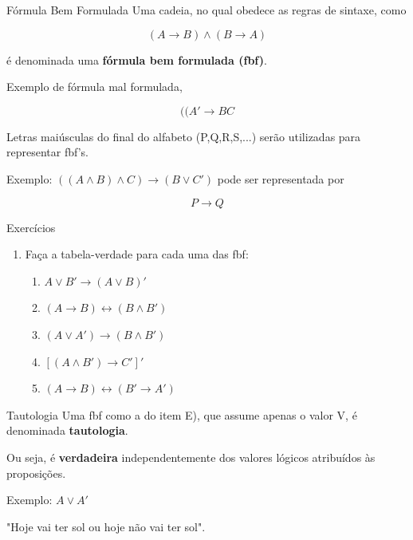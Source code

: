\documentclass[aspectratio=169]{beamer}
\begin{document}
\begin{frame}{Fórmula Bem Formulada}
    Uma cadeia, no qual obedece as regras de sintaxe, como

    \[(A \rightarrow B) \wedge (B \rightarrow A)\]


    é denominada uma \textbf{fórmula bem formulada (fbf)}.

    \vspace{5mm}

    Exemplo de fórmula mal formulada,

    \[((A' \rightarrow BC \]

    Letras maiúsculas do final do alfabeto (P,Q,R,S,...) serão utilizadas para representar fbf's.

    Exemplo: $ ((A \wedge B)\wedge C) \rightarrow (B \vee C')$ pode ser representada por

    \[ P \rightarrow Q \]

\end{frame}

\begin{frame}{Exercícios}
    \begin{enumerate}
        \item Faça a tabela-verdade para cada uma das fbf:
              \begin{enumerate}[a]
                  \item $ A \vee B' \rightarrow (A \vee B)' $
                  \item $ (A \rightarrow B) \leftrightarrow (B \wedge B') $
                  \item $ (A \vee A') \rightarrow (B \wedge B')$
                  \item $ [(A \wedge B') \rightarrow C']'$
                  \item $ (A \rightarrow B) \leftrightarrow (B' \rightarrow A') $
              \end{enumerate}
    \end{enumerate}

\end{frame}

\begin{frame}{Tautologia}
    Uma fbf como a do item E), que assume apenas o valor V, é denominada \textbf{tautologia}.
    \vspace{5mm}

    Ou seja, é \textbf{verdadeira} independentemente dos valores lógicos atribuídos às proposições.
    \vspace{5mm}

    Exemplo: $ A \vee A'$
    \vspace{5mm}

    "Hoje vai ter sol ou hoje não vai ter sol".
\end{frame}
\end{document}
